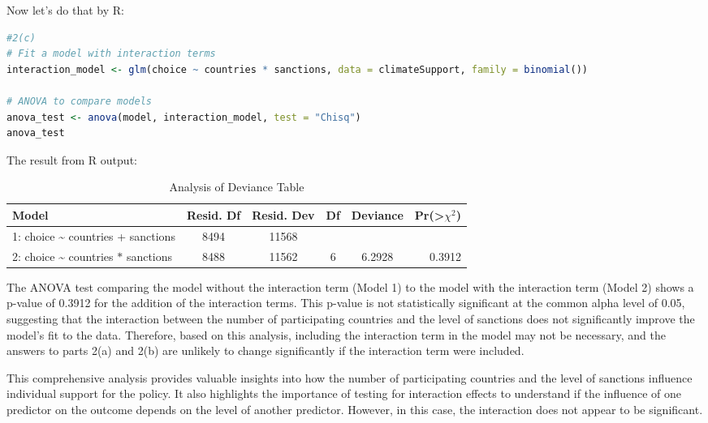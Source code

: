 \documentclass[12pt,letterpaper]{article}
\begin{document}
 Now let's do that by R:
 \begin{lstlisting}[language=R]
#2(c)
# Fit a model with interaction terms
interaction_model <- glm(choice ~ countries * sanctions, data = climateSupport, family = binomial())

# ANOVA to compare models
anova_test <- anova(model, interaction_model, test = "Chisq")
anova_test
\end{lstlisting}
The result from R output:	
\begin{table}[ht]
\centering
\caption{Analysis of Deviance Table}
\label{tab:anova-test}
\begin{tabular}{@{}lccccr@{}}
\toprule
Model & Resid. Df & Resid. Dev & Df & Deviance & Pr(>\(\chi^2\)) \\ \midrule
1: choice \textasciitilde{} countries + sanctions & 8494 & 11568 & & & \\
2: choice \textasciitilde{} countries \(*\) sanctions & 8488 & 11562 & 6 & 6.2928 & 0.3912 \\ \bottomrule
\end{tabular}
\end{table}



The ANOVA test comparing the model without the interaction term (Model 1) to the model with the interaction term (Model 2) shows a p-value of 0.3912 for the addition of the interaction terms. This p-value is not statistically significant at the common alpha level of 0.05, suggesting that the interaction between the number of participating countries and the level of sanctions does not significantly improve the model's fit to the data. Therefore, based on this analysis, including the interaction term in the model may not be necessary, and the answers to parts 2(a) and 2(b) are unlikely to change significantly if the interaction term were included.

This comprehensive analysis provides valuable insights into how the number of participating countries and the level of sanctions influence individual support for the policy. It also highlights the importance of testing for interaction effects to understand if the influence of one predictor on the outcome depends on the level of another predictor. However, in this case, the interaction does not appear to be significant.
\end{document}
